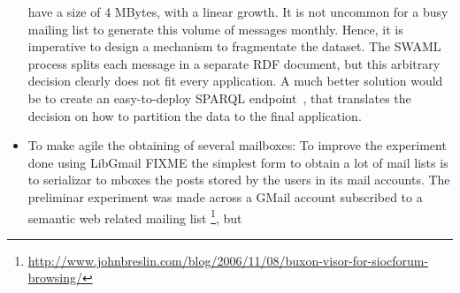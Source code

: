 \documentclass{llncs}
\begin{document}
\begin{itemize}
        have a size of 4 MBytes, with a linear growth. It is not uncommon
        for a busy mailing list to generate this volume of messages
        monthly. Hence, it is imperative to design a mechanism to
        fragmentate the dataset. The SWAML process splits each message
        in a separate RDF document, but this arbitrary decision clearly
        does not fit every application. A much better solution would be to
        create an easy-to-deploy SPARQL endpoint~\cite{SPARQL},
        that translates the
        decision on how to partition the data to the final application.
  \item To make agile the obtaining of several mailboxes:
	To improve the experiment done using LibGmail
	FIXME
	the simplest form to obtain a lot of mail lists is to serializar to mboxes 
	the posts stored by the users in its mail accounts. The preliminar experiment 
	was made across a GMail account subscribed to a semantic web related mailing list
	\footnote{\url{http://www.johnbreslin.com/blog/2006/11/08/buxon-visor-for-siocforum-browsing/}},
	but 
\end{itemize}

%



%
\end{document}
